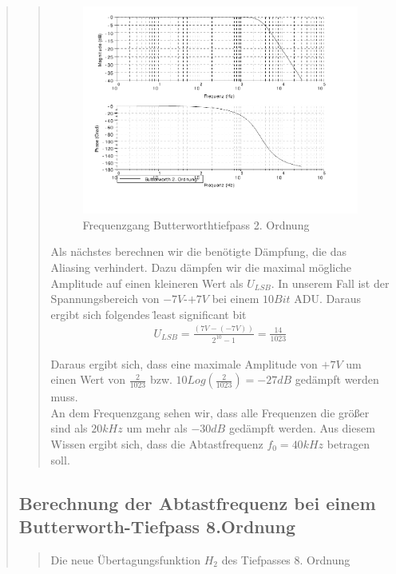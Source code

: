 \begin{quote}
\begin{quote}
        \begin{figure}[H]
			\centering
				\includegraphics[scale=1]{Frequenzgang}
				   \caption{Frequenzgang Butterworthtiefpass 2. Ordnung}
		\end{figure}
		\vspace{1em}
	 	
	   Als nächstes berechnen wir die benötigte Dämpfung, die das Aliasing verhindert. Dazu dämpfen wir die maximal
	   mögliche Amplitude auf einen kleineren Wert als $U_{LSB}$. In unserem Fall ist der Spannungsbereich von $-7V$-$+7V$
	   bei einem $10Bit$ ADU. Daraus ergibt sich folgendes \"least significant bit\"
	   
	   \begin{equation*}
        	\begin{split}
        		U_{LSB} = \frac{(7V-(-7V))}{2^{10}-1} = \frac{14}{1023}
        	\end{split}
        \end{equation*}
        
        Daraus ergibt sich, dass eine maximale Amplitude von $+7V$ um einen Wert von $\frac{2}{1023}$ bzw. $10
        Log(\frac{2}{1023}) = -27 dB$ gedämpft werden muss. \\
        An dem Frequenzgang sehen wir, dass alle Frequenzen die größer sind als $20kHz$ um mehr als $-30 dB$ gedämpft
        werden. Aus diesem Wissen ergibt sich, dass die Abtastfrequenz $f_0 = 40kHz$ betragen soll.
        
    \end{quote}
    
    \subsection{Berechnung der Abtastfrequenz bei einem Butterworth-Tiefpass 8.Ordnung}
    \begin{quote}
        Die neue Übertagungsfunktion $H_2$ des Tiefpasses 8. Ordnung
        

\end{quote}
\end{quote}
